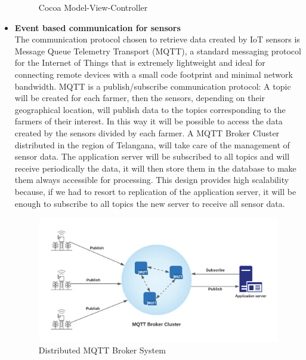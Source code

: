 \documentclass[10pt]{article} %
\begin{document}
\begin{itemize}
\begin{figure}[h]
        \caption{Cocoa Model-View-Controller}
        \label{fig:mvc}
    \end{figure}
    \item \textbf{Event based communication for sensors}\\The communication protocol chosen to retrieve 
    data created by IoT sensors is Message Queue Telemetry Transport (MQTT), a standard messaging 
    protocol for the Internet of Things that is extremely lightweight and ideal for connecting remote 
    devices with a small code footprint and minimal network bandwidth. MQTT is a publish/subscribe 
    communication protocol: A topic will be created for each farmer, then the sensors, depending on 
    their geographical location, will publish data to the topics corresponding to the farmers of 
    their interest. In this way it will be possible to access the data created by the sensors divided 
    by each farmer. A MQTT Broker Cluster distributed in the region of Telangana, will take care of 
    the management of sensor data. The application server will be subscribed to all topics and will 
    receive periodically the data, it will then store them in the database to make them always 
    accessible for processing.
    This design provides high scalability because, if we had to resort to replication of the 
    application server, it will be enough to subscribe to all topics the new server to receive 
    all sensor data.
    \begin{figure}[t]
        \centering
        \includegraphics[scale=0.68]{images/mqtt.png}
        \caption{Distributed MQTT Broker System}
        \label{fig:mqtt}
    \end{figure}
\end{itemize}
\newpage
\end{document}
